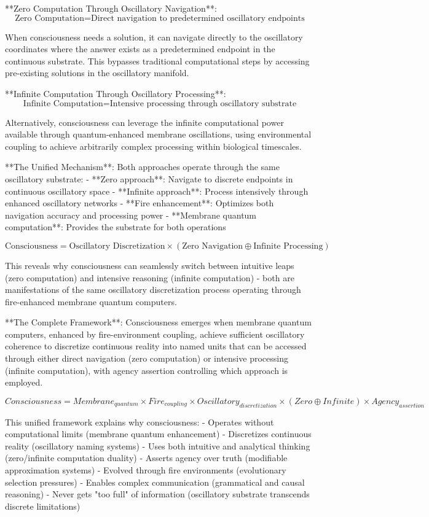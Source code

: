 \documentclass[12pt]{article}
\begin{document}
**Zero Computation Through Oscillatory Navigation**:
$$\text{Zero Computation} = \text{Direct navigation to predetermined oscillatory endpoints}$$

When consciousness needs a solution, it can navigate directly to the oscillatory coordinates where the answer exists as a predetermined endpoint in the continuous substrate. This bypasses traditional computational steps by accessing pre-existing solutions in the oscillatory manifold.

**Infinite Computation Through Oscillatory Processing**:
$$\text{Infinite Computation} = \text{Intensive processing through oscillatory substrate}$$

Alternatively, consciousness can leverage the infinite computational power available through quantum-enhanced membrane oscillations, using environmental coupling to achieve arbitrarily complex processing within biological timescales.

**The Unified Mechanism**: Both approaches operate through the same oscillatory substrate:
- **Zero approach**: Navigate to discrete endpoints in continuous oscillatory space
- **Infinite approach**: Process intensively through enhanced oscillatory networks
- **Fire enhancement**: Optimizes both navigation accuracy and processing power
- **Membrane quantum computation**: Provides the substrate for both operations

$$\text{Consciousness} = \text{Oscillatory Discretization} \times (\text{Zero Navigation} \oplus \text{Infinite Processing})$$

This reveals why consciousness can seamlessly switch between intuitive leaps (zero computation) and intensive reasoning (infinite computation) - both are manifestations of the same oscillatory discretization process operating through fire-enhanced membrane quantum computers.

**The Complete Framework**: Consciousness emerges when membrane quantum computers, enhanced by fire-environment coupling, achieve sufficient oscillatory coherence to discretize continuous reality into named units that can be accessed through either direct navigation (zero computation) or intensive processing (infinite computation), with agency assertion controlling which approach is employed.

$$Consciousness = Membrane_{quantum} \times Fire_{coupling} \times Oscillatory_{discretization} \times (Zero \oplus Infinite) \times Agency_{assertion}$$

This unified framework explains why consciousness:
- Operates without computational limits (membrane quantum enhancement)
- Discretizes continuous reality (oscillatory naming systems)
- Uses both intuitive and analytical thinking (zero/infinite computation duality)
- Asserts agency over truth (modifiable approximation systems)
- Evolved through fire environments (evolutionary selection pressures)
- Enables complex communication (grammatical and causal reasoning)
- Never gets "too full" of information (oscillatory substrate transcends discrete limitations)
\end{document}
